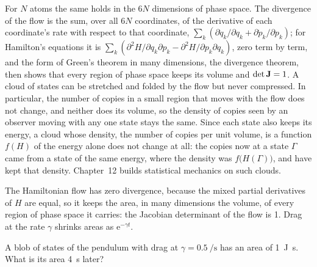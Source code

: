 For $N$ atoms the same holds in the $6N$ dimensions of phase space. The
divergence of the flow is the sum, over all $6N$ coordinates, of the
derivative of each coordinate's rate with respect to that coordinate,
$\sum_k(\partial\dot{q}_k/\partial q_k + \partial\dot{p}_k/\partial p_k)$;
for Hamilton's equations it is $\sum_k(\partial^2H/\partial q_k\partial
p_k - \partial^2H/\partial p_k\partial q_k)$, zero term by term, and the form of
Green's theorem in many dimensions, the divergence
theorem\cite{Tuckerman2023}, then shows that every region of phase space
keeps its volume and $\det\bm{\mathrm{J}} = 1$. A cloud of states can be stretched and folded by
the flow but never compressed. In particular, the number of copies in a
small region that moves with the flow does not change, and neither does
its volume, so the density of copies seen by an observer moving with any
one state stays the same. Since each state also keeps its energy, a cloud
whose density, the number of copies per unit volume, is a function
$f(H)$ of the energy alone does not change at all: the copies now at a
state $\Gamma$ came from a state of the same energy, where the density was
$f\bigl(H(\Gamma)\bigr)$, and have kept that density. Chapter~12 builds statistical mechanics
on such clouds.

\begin{keyidea}
The Hamiltonian flow has zero divergence, because the mixed partial
derivatives of $H$ are equal, so it keeps the area, in many dimensions the
volume, of every region of phase space it carries: the Jacobian
determinant of the flow is 1. Drag at the rate $\gamma$ shrinks areas as
$\mathrm{e}^{-\gamma t}$.
\end{keyidea}


\begin{selfcheck}
A blob of states of the pendulum with drag at $\gamma =
\SI{0.5}{\per\second}$ has an area of \SI{1}{\joule\second}. What is its
area \SI{4}{\second} later?
\end{selfcheck}
